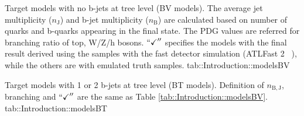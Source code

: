 

{Target models with no b-jets at tree level (BV models). The average jet multiplicity ($n_{\mathrm{J}}$) and b-jet multiplicity ($n_{\mathrm{B}}$) are calculated based on number of quarks and b-quarks appearing in the final state. The PDG values \cite{PDG2016} are referred for branching ratio of top, W/Z/h bosons. $``\checkmark''$ specifies the models with the final result derived using the samples with the fast detector simulation (ATLFast 2 ~\cite{atlfast}), while the others are with emulated truth samples.}
{tab::Introduction::modelsBV}



{Target models with 1 or 2 b-jets at tree level (BT models). 
Definition of $n_{\mathrm{B,J}}$, branching and $``\checkmark''$ are the same as Table \ref{tab::Introduction::modelsBV}.}
{tab::Introduction::modelsBT}



